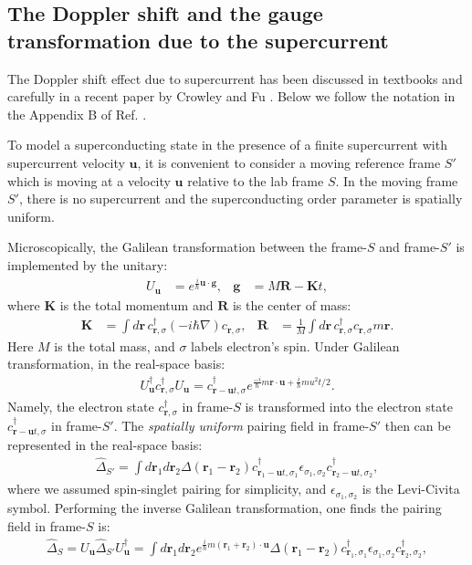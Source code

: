 \begin{subappendices}
\section{The Doppler shift and the gauge transformation due to the supercurrent}
The Doppler shift effect due to supercurrent has been discussed in textbooks and carefully in a recent paper by Crowley and Fu \cite{crowley2022supercurrent}. Below we follow the notation in the Appendix B of Ref. \cite{crowley2022supercurrent}.

To model a superconducting state in the presence of a finite supercurrent with supercurrent velocity $\mathbf u $, it is convenient to consider a moving reference frame $S'$ which is moving at a velocity $\mathbf u$ relative to the lab frame $S$. In the moving frame $S'$, there is no supercurrent and the superconducting order parameter is spatially uniform. 

Microscopically, the Galilean transformation between the frame-$S$ and frame-$S'$ is implemented by the unitary:
\begin{align}
	U_{\mathbf u}&=e^{\frac{i}{\hbar}\mathbf u\cdot \mathbf g},& \mathbf g&=M\mathbf R-\mathbf K t,
\end{align} 
where $\mathbf K$ is the total momentum and $\mathbf R$ is the center of mass:
\begin{align}
	\mathbf K&=\int d\mathbf r\,c_{\mathbf r,\sigma}^\dagger (-i\hbar \nabla) c_{\mathbf r,\sigma},&\mathbf R&=\frac{1}{M}\int d\mathbf r\,c_{\mathbf r,\sigma}^\dagger c_{\mathbf r,\sigma}m \mathbf r.
\end{align}
Here $M$ is the total mass, and $\sigma$ labels electron's spin. Under Galilean transformation, in the real-space basis:
\begin{align}
	U^\dagger_{\mathbf u} c^\dagger_{\mathbf r,\sigma}U_{\mathbf u}=c^\dagger_{\mathbf r-\mathbf u t,\sigma}e^{\frac{-i}{\hbar}m\mathbf r\cdot \mathbf u+\frac{i}{\hbar}m u^2t/2}.
\end{align}
Namely, the electron state $c^\dagger_{\mathbf r,\sigma}$ in frame-$S$ is transformed into the electron state $c^\dagger_{\mathbf r-\mathbf u t,\sigma}$ in frame-$S'$. The \emph{spatially uniform} pairing field in frame-$S'$ then can be represented in the real-space basis:
\begin{align}
	\hat\Delta_{S'}=\int d\mathbf r_1 d\mathbf r_2 \Delta(\mathbf r_1-\mathbf r_2) c^\dagger_{\mathbf r_1-\mathbf u t,\sigma_1}\epsilon_{\sigma_1,\sigma_2} c^\dagger_{\mathbf r_2-\mathbf u t,\sigma_2},
\end{align}
where we assumed spin-singlet pairing for simplicity, and $\epsilon_{\sigma_1,\sigma_2}$ is the Levi-Civita symbol. Performing the inverse Galilean transformation, one finds the pairing field in frame-$S$ is:
\begin{align}
	\hat\Delta_{S}=U_{\mathbf u}\hat\Delta_{S'}U^\dagger_{\mathbf u}=\int d\mathbf r_1 d\mathbf r_2 e^{\frac{i}{\hbar}m(\mathbf r_1+\mathbf r_2)\cdot \mathbf u}\Delta(\mathbf r_1-\mathbf r_2) c^\dagger_{\mathbf r_1,\sigma_1}\epsilon_{\sigma_1,\sigma_2} c^\dagger_{\mathbf r_2,\sigma_2},
\end{align}


\end{subappendices}
